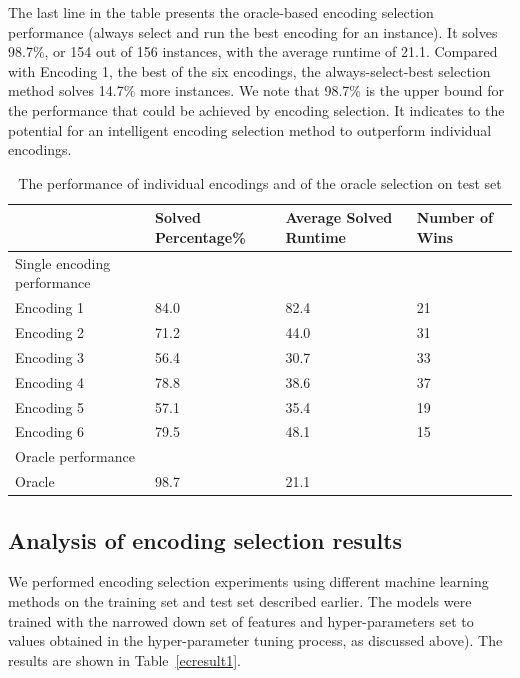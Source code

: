 \documentclass{new_tlp}
\begin{document}
The last line in the table presents the oracle-based encoding selection
performance (always select and run the best encoding for an instance). It 
solves 98.7\%, or 154 out of 156 instances, with the average runtime of 
21.1. Compared with Encoding 1, the best of the six encodings, the 
always-select-best selection method solves 14.7\% more instances. 
We note that 98.7\% is the upper bound for the performance that could 
be achieved by encoding selection. It indicates to the potential for an 
intelligent encoding selection method to outperform individual encodings.

\begin{table}
	\caption{The performance of individual encodings and of the 
oracle selection on test set} \label{testsetperf}
	\programmath
	\begin{tabular}{llll}
		\hline\hline
		& Solved Percentage\% & Average Solved Runtime & Number of 
Wins\\ \hline%
		Single encoding performance & & &                                     \\ %
		Encoding 1        & 84.0          & 82.4                      & 21            \\ %
		Encoding 2        & 71.2           & 44.0                      & 31            \\ %
		Encoding 3        & 56.4           & 30.7                       & 33            \\ %
		Encoding 4        & 78.8           & 38.6                      & 37            \\ %
		Encoding 5        & 57.1          & 35.4                      & 19            \\ %
		Encoding 6        & 79.5          & 48.1                      & 15            \\\hline %
		Oracle performance  & & &                                               \\ %
		Oracle            & 98.7           & 21.1                      &               \\ \hline\hline
	\end{tabular}
	\programmath
\end{table}

\subsection{Analysis of encoding selection results}

We performed encoding selection experiments using different machine learning 
methods on the training set and test set described earlier. The models were
trained with the narrowed down set of features and hyper-parameters set to
values obtained in the hyper-parameter tuning process, as discussed above).
The results are shown in Table~\ref{ecresult1}. 
\end{document}
